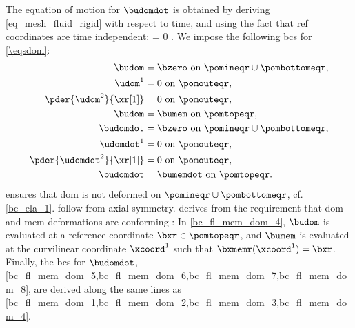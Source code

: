 The equation of motion for $\budomdot$ is obtained by deriving \cref{eq_mesh_fluid_rigid} with respect to time, and using the fact that \ac{ref} coordinates are time independent:
\be
\label{eq_mesh_fluid_rigid_dot}
\pder{}{\xr[\beta]}  = 0  \omr.
\ee
We impose the following \acp{bc} for  \cref{\eqsdom}:
\begin{align}
        \label{bc_fl_mem_dom_1}
        \budom                    & = \bzero \text{ on }\pomineqr \cup \pombottomeqr, \\
        \label{bc_fl_mem_dom_2}
        \udom^1                   & = 0 \text{ on } \pomouteqr,                       \\
        \label{bc_fl_mem_dom_3}
        \pder{\udom^2}{\xr[1]}    & = 0 \text{ on }\pomouteqr,                        \\
        \label{bc_fl_mem_dom_4}
        \budom                    & = \bumem \text{ on }\pomtopeqr,                   \\
        \label{bc_fl_mem_dom_5}
        \budomdot                 & = \bzero \text{ on }\pomineqr \cup \pombottomeqr, \\
        \label{bc_fl_mem_dom_6}
        \udomdot^1                & = 0 \text{ on } \pomouteqr,                       \\
        \label{bc_fl_mem_dom_7}
        \pder{\udomdot^2}{\xr[1]} & = 0 \text{ on }\pomouteqr,                        \\
        \label{bc_fl_mem_dom_8}
        \budomdot                 & = \bumemdot \text{ on }\pomtopeqr.
\end{align}
 ensures that \ac{dom} is not deformed on $\pomineqr \cup \pombottomeqr$, cf. \cref{bc_ela_1}.  follow from axial symmetry.
 derives from the requirement that \ac{dom} and \ac{mem} deformations are conforming \cite{kamenskyLectureNotesMAE}: In \cref{bc_fl_mem_dom_4}, $\budom$ is evaluated at a reference coordinate $\bxr \in \pomtopeqr$, and $\bumem$ is evaluated at the curvilinear coordinate $\xcoord^1$ such that $\bxmemr(\xcoord^1) = \bxr$. Finally, the  \acp{bc} for $\budomdot$, \cref{bc_fl_mem_dom_5,bc_fl_mem_dom_6,bc_fl_mem_dom_7,bc_fl_mem_dom_8}, are derived along the same lines as \cref{bc_fl_mem_dom_1,bc_fl_mem_dom_2,bc_fl_mem_dom_3,bc_fl_mem_dom_4}.



